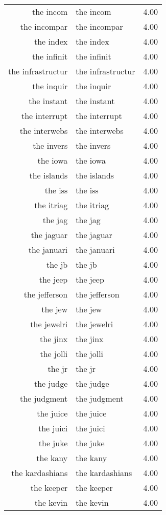 \begin{table}[ht]
\begin{tabular}{rlr}
  the incom & the incom & 4.00 \\ 
  the incompar & the incompar & 4.00 \\ 
  the index & the index & 4.00 \\ 
  the infinit & the infinit & 4.00 \\ 
  the infrastructur & the infrastructur & 4.00 \\ 
  the inquir & the inquir & 4.00 \\ 
  the instant & the instant & 4.00 \\ 
  the interrupt & the interrupt & 4.00 \\ 
  the interwebs & the interwebs & 4.00 \\ 
  the invers & the invers & 4.00 \\ 
  the iowa & the iowa & 4.00 \\ 
  the islands & the islands & 4.00 \\ 
  the iss & the iss & 4.00 \\ 
  the itriag & the itriag & 4.00 \\ 
  the jag & the jag & 4.00 \\ 
  the jaguar & the jaguar & 4.00 \\ 
  the januari & the januari & 4.00 \\ 
  the jb & the jb & 4.00 \\ 
  the jeep & the jeep & 4.00 \\ 
  the jefferson & the jefferson & 4.00 \\ 
  the jew & the jew & 4.00 \\ 
  the jewelri & the jewelri & 4.00 \\ 
  the jinx & the jinx & 4.00 \\ 
  the jolli & the jolli & 4.00 \\ 
  the jr & the jr & 4.00 \\ 
  the judge & the judge & 4.00 \\ 
  the judgment & the judgment & 4.00 \\ 
  the juice & the juice & 4.00 \\ 
  the juici & the juici & 4.00 \\ 
  the juke & the juke & 4.00 \\ 
  the kany & the kany & 4.00 \\ 
  the kardashians & the kardashians & 4.00 \\ 
  the keeper & the keeper & 4.00 \\ 
  the kevin & the kevin & 4.00 \\ 

\end{tabular}
\end{table}
